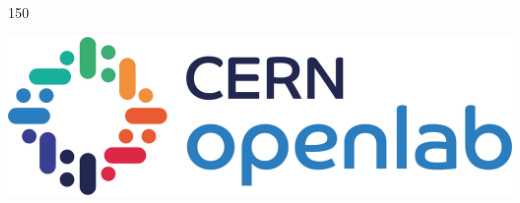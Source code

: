\begin{titlepage}
\begin{center}
\begin{textblock}{150}
\begin{figure}
\begin{minipage}[r]{0.2 \textwidth}
\end{minipage}    
\end{figure}
\end{textblock}


\vspace*{20mm}


\vfill
\version

\vfill
\large
\includegraphics[scale=0.095]{figures/openlab}
\setlength{\parindent}{\backupparindent}
\end{center}
\end{titlepage} 